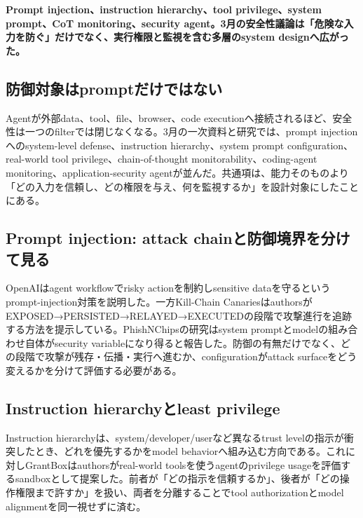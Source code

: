 \noindent\textbf{Prompt injection、instruction hierarchy、tool privilege、system prompt、CoT monitoring、security agent。3月の安全性議論は「危険な入力を防ぐ」だけでなく、実行権限と監視を含む多層のsystem designへ広がった。}\autocite{src-18b7ee4fe5e4,src-3dec299964e6,src-87dacccfecfd,src-b4b340379768}

\subsection{防御対象はpromptだけではない}

Agentが外部data、tool、file、browser、code executionへ接続されるほど、安全性は一つのfilterでは閉じなくなる。3月の一次資料と研究では、prompt injectionへのsystem-level defense、instruction hierarchy、system prompt configuration、real-world tool privilege、chain-of-thought monitorability、coding-agent monitoring、application-security agentが並んだ。共通項は、能力そのものより「どの入力を信頼し、どの権限を与え、何を監視するか」を設計対象にしたことにある。\autocite{src-18b7ee4fe5e4,src-287a6bf67154,src-3dec299964e6,src-549bffaad22c,src-5becf449a527,src-87dacccfecfd,src-b4b340379768,src-e627c8192172}


\subsection{Prompt injection: attack chainと防御境界を分けて見る}

OpenAIはagent workflowでrisky actionを制約しsensitive dataを守るというprompt-injection対策を説明した。一方Kill-Chain CanariesはauthorsがEXPOSED→PERSISTED→RELAYED→EXECUTEDの段階で攻撃進行を追跡する方法を提示している。PhishNChipsの研究はsystem promptとmodelの組み合わせ自体がsecurity variableになり得ると報告した。防御の有無だけでなく、どの段階で攻撃が残存・伝播・実行へ進むか、configurationがattack surfaceをどう変えるかを分けて評価する必要がある。\autocite{src-3dec299964e6,src-87dacccfecfd,src-e627c8192172}


\subsection{Instruction hierarchyとleast privilege}

Instruction hierarchyは、system/developer/userなど異なるtrust levelの指示が衝突したとき、どれを優先するかをmodel behaviorへ組み込む方向である。これに対しGrantBoxはauthorsがreal-world toolsを使うagentのprivilege usageを評価するsandboxとして提案した。前者が「どの指示を信頼するか」、後者が「どの操作権限まで許すか」を扱い、両者を分離することでtool authorizationとmodel alignmentを同一視せずに済む。\autocite{src-18b7ee4fe5e4,src-549bffaad22c}


